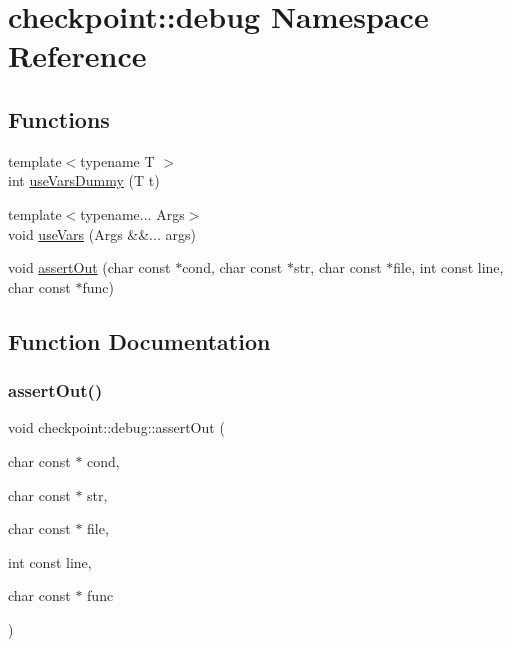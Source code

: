 \hypertarget{namespacecheckpoint_1_1debug}{}\section{checkpoint\+:\+:debug Namespace Reference}
\label{namespacecheckpoint_1_1debug}
\subsection*{Functions}
\begin{DoxyCompactItemize}
\item 
{\footnotesize template$<$typename T $>$ }\\int \hyperlink{namespacecheckpoint_1_1debug_a53cb770a4dd52d64540496968837a0d2}{use\+Vars\+Dummy} (T t)
\item 
{\footnotesize template$<$typename... Args$>$ }\\void \hyperlink{namespacecheckpoint_1_1debug_a5e12dcf51f9402c5a45e13213b26d1d6}{use\+Vars} (Args \&\&... args)
\item 
void \hyperlink{namespacecheckpoint_1_1debug_afcd275cc3ba7d3c57ca1c39017dab5c4}{assert\+Out} (char const $\ast$cond, char const $\ast$str, char const $\ast$file, int const line, char const $\ast$func)
\end{DoxyCompactItemize}


\subsection{Function Documentation}
\mbox{\label{namespacecheckpoint_1_1debug_afcd275cc3ba7d3c57ca1c39017dab5c4}} 
\subsubsection{\texorpdfstring{assert\+Out()}{assertOut()}}
{\footnotesize\ttfamily void checkpoint\+::debug\+::assert\+Out (\begin{DoxyParamCaption}\item[{char const $\ast$}]{cond,  }\item[{char const $\ast$}]{str,  }\item[{char const $\ast$}]{file,  }\item[{int const}]{line,  }\item[{char const $\ast$}]{func }\end{DoxyParamCaption})\hspace{0.3cm}{\ttfamily [inline]}}

